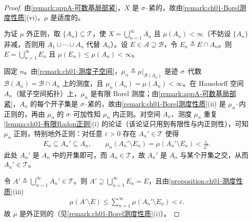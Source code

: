\documentclass[../../main.tex]{subfiles}%
\begin{document}
\begin{proof}
由\cref{remark:appA-可数基局部紧}，$X$ 是 $\sigma$--紧的，故由\cref{remark:ch01-Borel测度性质}(vi)，$\mu$ 是适度的。

为证 $\mu$ 外正则，取 $\{A_n\}\subseteq\mathcal{T}$，使 $X=\bigcup_{n=1}^\infty A_n$ 且 $\mu(A_n)<\infty$（不妨设 $\{A_n\}$ 非减，否则用 $A_1\cup\cdots\cup A_n$ 代替 $A_n$）。设 $E\in\mathcal{A}\supseteq\mathcal{B}$，令 $E_n\triangleq E\cap A_n$。则 $E=\bigcup_{n=1}^\infty E_n$ 且 $\mu(E_n)\leqslant\mu(A_n)<\infty$。

固定 $n$。由\cref{remark:ch01-测度子空间}，$\mu_n\triangleq\mu|_{\mathcal{B}(A_n)}$ 是迹 $\sigma$--代数 $\mathcal{B}(A_n)=\mathcal{B}\cap A_n$ 上的测度，且 $\mu_n(A_n)=\mu(A_n)<\infty$。在 Hausdorff 空间 $A_n$（赋子空间拓扑）上，$\mu_n$ 是有限 Borel 测度；由\cref{remark:appA-可数基局部紧}，$A_n$ 的每个开子集是 $\sigma$--紧的，故由\cref{remark:ch01-Borel测度性质}(ii) 是 $\mu_n$--内正则的，再由 $\mu_n$ 的 $\sigma$--可加性知 $\mu_n$ 内正则。对空间 $A_n$、测度 $\mu_n$ 重复\cref{lemma:ch01-有限Radon正则}(i) 的论证（该论证只用到有限性与内正则性），可知 $\mu_n$ 正则，特别地外正则：对任意 $\varepsilon>0$ 存在 $A_n'\in\mathcal{T}$ 使得
\begin{align*}
E_n\subseteq A_n'\subseteq A_n,\qquad\mu_n(A_n'\setminus E_n)=\mu(A_n'\setminus E_n)<\frac{\varepsilon}{2^n}.
\end{align*}
此处 $A_n'$ 是 $A_n$ 中的开集即可，而 $A_n\in\mathcal{T}$，故 $A_n'$ 是 $A_n$ 与某个开集之交，从而 $A_n'\in\mathcal{T}$。

令 $A'\triangleq\bigcup_{n=1}^\infty A_n'\in\mathcal{T}$。则 $A'\supseteq\bigcup_{n=1}^\infty E_n=E$，且由\cref{proposition:ch01-测度性质}(iii)
\begin{align*}
\mu(A'\setminus E)\leqslant\sum_{n=1}^\infty\mu(A_n'\setminus E_n)<\varepsilon.
\end{align*}
故 $\mu$ 是外正则的（见\cref{remark:ch01-Borel测度性质}(i)）。


\end{proof}
\end{document}
